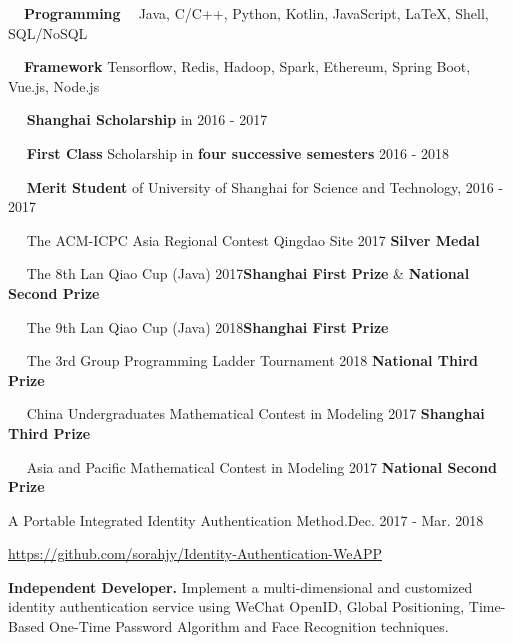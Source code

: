 \documentclass{sorahjy_cv}
\begin{document}
%
%

\begin{description}{}
	\item{\textbf{\ \ Programming \ }} Java, C/C++, Python, Kotlin, JavaScript, \LaTeX, Shell, SQL/NoSQL
	\item{\textbf{\ \ Framework\quad \quad}} Tensorflow, Redis, Hadoop, Spark, Ethereum, Spring Boot, Vue.js, Node.js 
\end{description}


%
%

\begin{description}{}
	\item{\ \ } \textbf{Shanghai Scholarship} in 2016 - 2017
	\item{\ \ } \textbf{First Class} Scholarship in \textbf{four successive semesters} 2016 - 2018
	\item{\ \ } \textbf{Merit Student} of University of Shanghai for Science and Technology, 2016 - 2017
	\item{\ \ } The ACM-ICPC Asia Regional Contest Qingdao Site 2017 \hfill \textbf{Silver Medal}
	\item{\ \ } The 8th Lan Qiao Cup (Java) 2017\hfill \textbf{Shanghai First Prize} \& \textbf{National Second Prize}
	\item{\ \ } The 9th Lan Qiao Cup (Java) 2018\hfill \textbf{Shanghai First Prize}
	\item{\ \ } The 3rd Group Programming Ladder Tournament 2018 \hfill \textbf{National Third Prize}
	\item{\ \ } China Undergraduates Mathematical Contest in Modeling 2017 \hfill \textbf{Shanghai Third Prize}
	\item{\ \ } Asia and Pacific Mathematical Contest in Modeling 2017 \hfill \textbf{National Second Prize}
\end{description}


%
%

\begin{sectionContentSimple}{A Portable Integrated Identity Authentication Method.}{Dec. 2017 - Mar. 2018}
	\item \url{https://github.com/sorahjy/Identity-Authentication-WeAPP}
	\item \textbf{Independent Developer.} Implement a multi-dimensional and customized identity authentication service using WeChat OpenID, Global Positioning, Time-Based One-Time Password Algorithm and Face Recognition techniques.
\end{sectionContentSimple}
\end{document}
